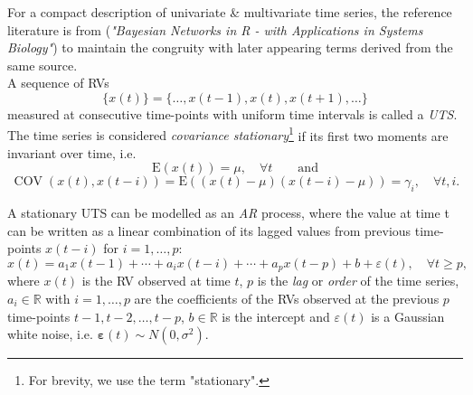 
For a compact description of {univariate \& multivariate time series, the reference literature is from \cite{nagarajan2013bayesian} (\textit{"Bayesian Networks in R - with Applications in Systems Biology"})  to maintain the congruity with later appearing terms derived from the same source.
\\

A sequence of \acp{RV} 
\begin{equation}
\{x(t)\}=\{\ldots, x(t-1), x(t), x(t+1), \ldots\}
\end{equation}
measured at consecutive time-points with uniform time intervals is called a \textit{\ac{UTS}}. The time series is considered \textit{covariance stationary}\footnote{For brevity, we use the term "stationary".}} if its first two moments are invariant over time, i.e.
\begin{equation}
\mathrm{E}(x(t))=\mu, \quad \forall t \qquad \text{and}
\end{equation}
\begin{equation} \operatorname{COV}(x(t), x(t-i))=\mathrm{E}((x(t)-\mu)(x(t-i)-\mu))=\gamma_{i}, \quad \forall t, i.
\end{equation}

A stationary \ac{UTS} can be modelled as an \textit{\ac{AR}} process, where the value at time t can be written as a linear combination of its lagged values from previous time-points $x(t-i)$ for $i=1,\ldots,p$:
\begin{equation}
 x(t)=a_{1} x(t-1)+\cdots+a_{i} x(t-i)+\cdots+a_{p} x(t-p)+b+\varepsilon(t), \quad \forall t \geqslant p,
 \label{eq:univariate_ts}
\end{equation}
where $x(t)$ is the \ac{RV} observed at time $t$, $p$ is the \textit{lag} or \textit{order} of the time series, $a_{i} \in \mathbb{R}$ with $i=1, \ldots, p$ are the coefficients of the \acp{RV} observed at the previous $p$ time-points $t-1, t-2, \ldots, t-p$, $b \in \mathbb{R}$ is the intercept and $\varepsilon(t)$ is a Gaussian white noise, i.e. $\boldsymbol{\varepsilon}(t) \sim N\left(0, \sigma^{2}\right)$. 
\\

